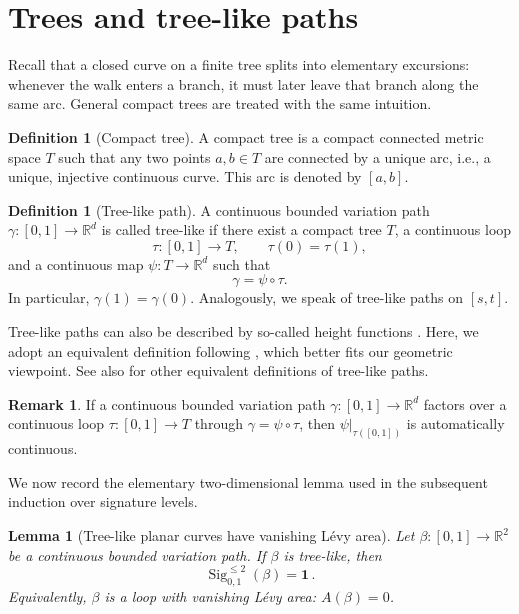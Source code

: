 \documentclass[11pt]{article}
\newtheorem{lemma}[theorem]{Lemma}
\theoremstyle{definition}
\newtheorem{definition}[theorem]{Definition}
\newtheorem{remark}[theorem]{Remark}
\newcommand{\R}{\mathbb{R}}
\newcommand{\Sig}{\operatorname{Sig}}
\newcommand{\id}{\mathbf{1}}
\begin{document}
\section{Trees and tree-like paths}\label{sec:tree-like}

Recall that a closed curve on a finite tree splits into elementary excursions: whenever the walk enters a branch, it must later leave that branch along the same arc. General compact trees are treated with the same intuition. 

\begin{definition}[Compact tree]
A compact tree is a compact connected metric space $T$ such that any two points $a,b\in T$ are connected by a unique arc, i.e., a unique, injective continuous curve. This arc is denoted by $[a,b]$.
\end{definition}


\begin{definition}[Tree-like path]
A continuous bounded variation path $ \gamma:[0,1]\to\R^d $ is called tree-like if there exist a compact tree $ T $, a continuous loop
\[
  \tau:[0,1]\to T,
  \qquad \tau(0)=\tau(1),
\]
and a continuous map $ \psi:T\to\R^d $ such that
\[
  \gamma=\psi\circ\tau.
\]
In particular, $ \gamma(1)=\gamma(0) $. Analogously, we speak of tree-like paths on $[s,t]$.
\end{definition}

Tree-like paths can also be described by so-called height functions \cite{HL2010}. Here, we adopt an equivalent definition following \cite{BGLY2016}, which better fits our geometric viewpoint. See also \cite[Theorem 5.15]{L2017} for other equivalent definitions of tree-like paths.


\begin{remark}\label{openmap}
If a continuous bounded variation path $ \gamma:[0,1]\to\R^d $ factors over a continuous loop $ \tau:[0,1] \to T$ through $ \gamma= \psi \circ \tau$, then $\psi|_{\tau([0,1])}$ is automatically continuous.
\end{remark}

We now record the elementary two-dimensional lemma used in the subsequent induction over signature levels.

\begin{lemma}[Tree-like planar curves have vanishing Lévy area]\label{lem:2DTreeLikeLemma}
Let $\beta:[0,1]\to\R^2$ be a continuous bounded variation path. If $\beta$ is tree-like, then
\[
  \Sig^{\leq 2}_{0,1}(\beta)=\id \, .
\]
Equivalently, $\beta$ is a loop  with vanishing Lévy area: $A(\beta) = 0$. 
\end{lemma}
\end{document}
